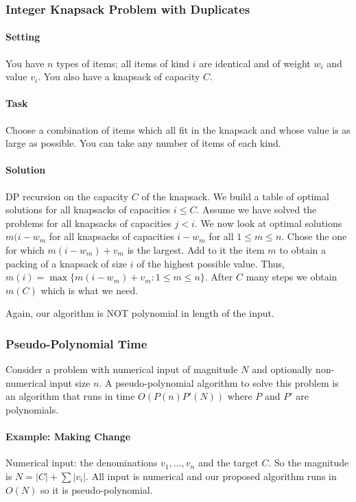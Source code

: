 \subsubsection{Integer Knapsack Problem with Duplicates}
\paragraph{Setting}
You have \(n\) types of items; all items of kind \(i\) are identical and of weight \(w_i\) and value \(v_i\). You also have a knapsack of capacity \(C\).

\paragraph{Task}
Choose a combination of items which all fit in the knapsack and whose value is as large as possible. You can take any number of items of each kind.

\paragraph{Solution}
DP recursion on the capacity \(C\) of the knapsack. We build a table of optimal solutions for all knapsacks of capacities \(i \leq C\). Assume we have solved the problems for all knapsacks of capacities \(j < i\). We now look at optimal solutions \(m(i - w_m\) for all knapsacks of capacities \(i - w_m\) for all \(1 \leq m \leq n\). Chose the one for which \(m(i - w_m) + v_m\) is the largest. Add to it the item \(m\) to obtain a packing of a knapsack of size \(i\) of the highest possible value. Thus, \(m(i) = \max\{m(i - w_m) + v_m : 1 \leq m \leq n\}\). After \(C\) many steps we obtain \(m(C)\) which is what we need. 

Again, our algorithm is NOT polynomial in length of the input.

\subsubsection{Pseudo-Polynomial Time}
Consider a problem with numerical input of magnitude \(N\) and optionally non-numerical input size \(n\). A pseudo-polynomial algorithm to solve this problem is an algorithm that runs in time \(O(P(n)P'(N))\) where \(P\) and \(P'\) are polynomials.

\paragraph{Example: Making Change}
Numerical input: the denominations \(v_1, \dots, v_n\) and the target \(C\). So the magnitude is \(N = |C| + \sum|v_i|\). All input is numerical and our proposed algorithm runs in \(O(N)\) so it is pseudo-polynomial.

